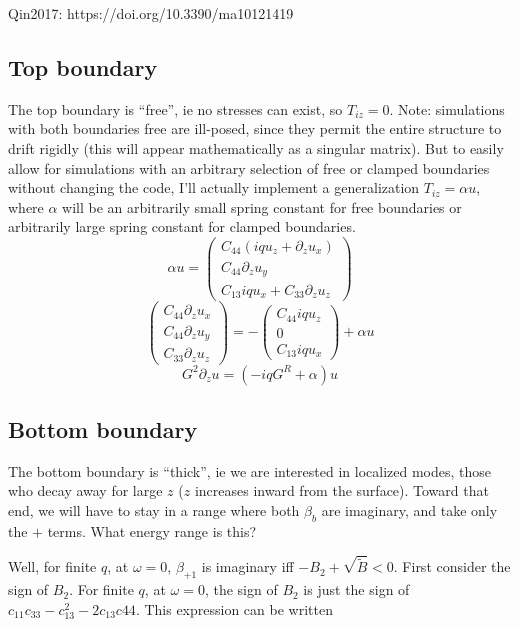 \documentclass{article}
\begin{document}
Qin2017: https://doi.org/10.3390/ma10121419


\subsection{Top boundary}
The top boundary is ``free'', ie no stresses can exist, so $T_{iz}=0$.  Note: simulations with both boundaries free are ill-posed, since they permit the entire structure to drift rigidly (this will appear mathematically as a singular matrix).  But to easily allow for simulations with an arbitrary selection of free or clamped boundaries without changing the code, I'll actually implement a generalization $T_{iz}=\alpha u$, where $\alpha$ will be an arbitrarily small spring constant for free boundaries or arbitrarily large spring constant for clamped boundaries.
\begin{equation}
  \alpha u=
  \begin{pmatrix}
    C_{44}\left( iqu_z+\partial_zu_x \right)\\
    C_{44}\partial_z u_y\\
    C_{13}iqu_x+C_{33}\partial_zu_z
  \end{pmatrix}
\end{equation}
\begin{equation}
  \begin{pmatrix}
    C_{44}\partial_z u_x\\C_{44}\partial_z u_y\\C_{33}\partial_zu_z
  \end{pmatrix}=-
  \begin{pmatrix}
    C_{44}iqu_z\\
    0\\
    C_{13}iqu_x
  \end{pmatrix}+\alpha u
\end{equation}
\begin{equation}
  G^2\partial_zu=\left(-iqG^R+\alpha\right)u
  \label{eq:topbc}
\end{equation}
\subsection{Bottom boundary}
The bottom boundary is ``thick'', ie we are interested in localized modes, those who decay away for large $z$ ($z$ increases inward from the surface).  Toward that end, we will have to stay in a range where both $\beta_b$ are imaginary, and take only the $+$ terms.  What energy range is this?

Well, for finite $q$, at $\omega=0$, $\beta_{+1}$ is imaginary iff $-B_2+\sqrt{\tilde B}<0$.  First consider the sign of $B_2$.  For finite $q$, at $\omega=0$, the sign of $B_2$ is just the sign of $c_{11}c_{33}-c_{13}^2-2c_{13}c{44}$.  This expression can be written
\end{document}
